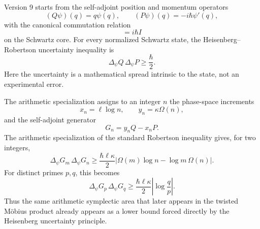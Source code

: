 \documentclass[11pt]{amsart}
\numberwithin{equation}{section}
\theoremstyle{plain}
\theoremstyle{definition}
\theoremstyle{remark}
\begin{document}
Version 9 starts from the self-adjoint position and momentum operators
\begin{equation}
(Q\psi)(q)=q\psi(q),
\qquad
(P\psi)(q)=-i\hbar\psi'(q),
\label{eq:intro_QP}
\end{equation}
with the canonical commutation relation
\begin{equation}
[Q,P]=i\hbar I
\label{eq:intro_CCR}
\end{equation}
on the Schwartz core.  For every normalized Schwartz state, the Heisenberg--Robertson uncertainty inequality is \cite{Robertson1929}
\begin{equation}
\boxed{\Delta_\psi Q\,\Delta_\psi P\ge\frac{\hbar}{2}.}
\label{eq:intro_heisenberg_uncertainty}
\end{equation}
Here the uncertainty is a mathematical spread intrinsic to the state, not an
experimental error.

The arithmetic specialization assigns to an integer \(n\) the phase-space
increments
\begin{equation}
x_n=\ell\log n,
\qquad
y_n=\kappa\Omega(n),
\label{eq:intro_phase_space_coordinates}
\end{equation}
and the self-adjoint generator
\begin{equation}
G_n=y_nQ-x_nP.
\label{eq:intro_Gn}
\end{equation}
The arithmetic specialization of the standard Robertson inequality gives, for two integers,
\begin{equation}
\boxed{
\Delta_\psi G_m\,\Delta_\psi G_n
\ge
\frac{\hbar\ell\kappa}{2}
\left|\Omega(m)\log n-\log m\,\Omega(n)\right|.}
\label{eq:intro_arithmetic_uncertainty}
\end{equation}
For distinct primes \(p,q\), this becomes
\begin{equation}
\boxed{
\Delta_\psi G_p\,\Delta_\psi G_q
\ge
\frac{\hbar\ell\kappa}{2}
\left|\log\frac{q}{p}\right|.}
\label{eq:intro_prime_uncertainty}
\end{equation}
Thus the same arithmetic symplectic area that later appears in the twisted
M\"obius product already appears as a lower bound forced directly by the
Heisenberg uncertainty principle.
\end{document}
